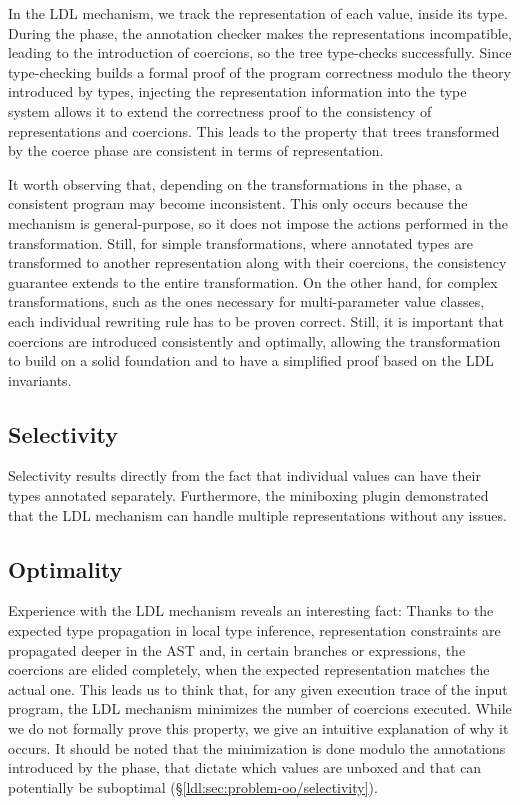 In the LDL mechanism, we track the representation of each value, inside its type. During the \coerce{} phase, the annotation checker makes the representations incompatible, leading to the introduction of coercions, so the tree type-checks successfully. Since type-checking builds a formal proof of the program correctness modulo the theory introduced by types, injecting the representation information into the type system allows it to extend the correctness proof to the consistency of representations and coercions. This leads to the property that trees transformed by the coerce phase are consistent in terms of representation.

It worth observing that, depending on the transformations in the \commit{} phase, a consistent program may become inconsistent. This only occurs because the mechanism is general-purpose, so it does not impose the actions performed in the \commit{} transformation. Still, for simple transformations, where annotated types are transformed to another representation along with their coercions, the consistency guarantee extends to the entire transformation. On the other hand, for complex transformations, such as the ones necessary for multi-parameter value classes, each individual rewriting rule has to be proven correct. Still, it is important that coercions are introduced consistently and optimally, allowing the \commit{} transformation to build on a solid foundation and to have a simplified proof based on the LDL invariants.

\subsection{Selectivity}

Selectivity results directly from the fact that individual values can have their types annotated separately. Furthermore, the miniboxing plugin demonstrated that the LDL mechanism can handle multiple representations without any issues.

\subsection{Optimality}
\label{ldl:sec:transform-props/optimality}

Experience with the LDL mechanism reveals an interesting fact: Thanks to the expected type propagation in local type inference, representation constraints are propagated deeper in the AST and, in certain branches or expressions, the coercions are elided completely, when the expected representation matches the actual one. This leads us to think that, for any given execution trace of the input program, the LDL mechanism minimizes the number of coercions executed. While we do not formally prove this property, we give an intuitive explanation of why it occurs. It should be noted that the minimization is done modulo the annotations introduced by the \inject{} phase, that dictate which values are unboxed and that can potentially be suboptimal (\S\ref{ldl:sec:problem-oo/selectivity}).

